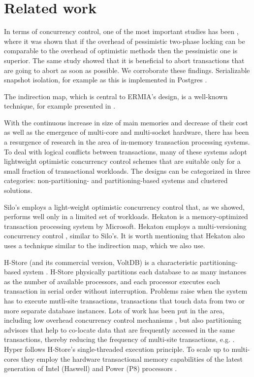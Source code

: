 
\section{Related work}

In terms of concurrency control, one of the most important studies has been \cite{AgrawalCL87}, where it was shown that if the overhead of pessimistic two-phase locking can be comparable to the overhead of optimistic methods then the pessimistic one is superior. The same study showed that it is beneficial to abort transactions that are going to abort as soon as possible. We corroborate these findings. 
Serializable snapshot isolation, for example as this is implemented in Postgres \cite{PortsG12}. 
 
The indirection map, which is central to ERMIA's design, is a well-known technique, for example presented in \cite{SadoghiRCB13}.

With the continuous increase in size of main memories and decrease of their cost as well as the emergence of multi-core and multi-socket hardware, there has been a resurgence of research in the area of in-memory transaction processing systems.  
To deal with logical conflicts between transactions, many of these systems adopt lightweight optimistic concurrency control schemes that are suitable only for a small fraction of transactional workloads.
The designs can be categorized in three categories: non-partitioning- and partitioning-based systems and clustered solutions. 

Silo's  \cite{TuZKLM13} employs a light-weight optimistic concurrency control that, as we showed, performs well only in a limited set of workloads. 
Hekaton \cite{Diaconu+13} is a memory-optimized transaction processing system by Microsoft. Hekaton employs a multi-versioning concurrency control \cite{LarsonBDFPZ11}, similar to Silo's. It is worth mentioning that Hekaton also uses a technique similar to the indirection map, which we also use. 


H-Store (and its commercial version, VoltDB) is a characteristic partitioning-based system \cite{Kallman+08}. H-Store physically partitions each database to as many instances as the number of available processors, and each processor executes each transaction in serial order without interruption.  
Problems raise when the system has to execute mutli-site transactions, transactions that touch data from two or more separate database instances. Lots of work has been put in the area, including low overhead concurrency control mechanisms \cite{JonesAM10}, but also partitioning advisors that help to co-locate data that are frequently accessed in the same transactions, thereby reducing the frequency of multi-site transactions, e.g. \cite{CurinoJZM10,PavloJZ11,TranNST14}.
Hyper \cite{KemperN11} follows H-Store's single-threaded execution principle.  To scale up to multi-cores they employ the hardware transactional memory capabilities of the latest generation of Intel (Haswell) and Power (P8) processors \cite{LeisKN14}. 

